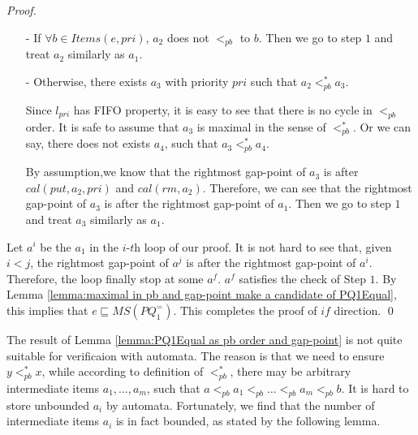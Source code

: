 \begin {proof}
\begin{itemize}
    \begin{itemize}
    \setlength{\itemsep}{0.5pt}
    \item[-] If $\forall b \in \textit{Items}(e,\textit{pri})$, $a_2$ does not $<_{\textit{pb}}$ to $b$. Then we go to step $1$ and treat $a_2$ similarly as $a_1$.
    \item[-] Otherwise, there exists $a_3$ with priority $\textit{pri}$ such that $a_2 <_{\textit{pb}}^* a_3$.

    Since $l_{\textit{pri}}$ has FIFO property, it is easy to see that there is no cycle in $<_{\textit{pb}}$ order. It is safe to assume that $a_3$ is maximal in the sense of $<_{\textit{pb}}^*$. Or we can say, there does not exists $a_4$, such that $a_3 <_{\textit{pb}}^* a_4$.

    By assumption,we know that the rightmost gap-point of $a_3$ is after $\textit{cal}(\textit{put},a_2,\textit{pri})$ and $\textit{cal}(\textit{rm},a_2)$. Therefore, we can see that the rightmost gap-point of $a_3$ is after the rightmost gap-point of $a_1$. Then we go to step $1$ and treat $a_3$ similarly as $a_1$.
    \end{itemize}
\end{itemize}

Let $a^i$ be the $a_1$ in the $\textit{i-th}$ loop of our proof. It is not hard to see that, given $i<j$, the rightmost gap-point of $a^j$ is after the rightmost gap-point of $a^i$. Therefore, the loop finally stop at some $a^f$. $a^f$ satisfies the check of Step $1$. By Lemma \ref{lemma:maximal in pb and gap-point make a candidate of PQ1Equal}, this implies that $e \sqsubseteq \textit{MS}(\textit{PQ}_1^{=})$. This completes the proof of $\textit{if}$ direction. \qed
\end {proof}

The result of Lemma \ref{lemma:PQ1Equal as pb order and gap-point} is not quite suitable for verificaion with automata. The reason is that we need to ensure $y <_{\textit{pb}}^* x$, while according to definition of $<_{\textit{pb}}^*$, there may be arbitrary intermediate items $a_1,\ldots,a_m$, such that $a <_{\textit{pb}} a_1 <_{\textit{pb}} \ldots <_{\textit{pb}} a_m <_{\textit{pb}} b$. It is hard to store unbounded $a_i$ by automata. Fortunately, we find that the number of intermediate items $a_i$ is in fact bounded, as stated by the following lemma.


